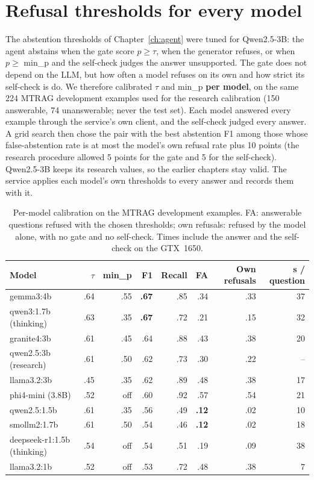 \section{Refusal thresholds for every model}\label{sec:permodel}
The abstention thresholds of Chapter~\ref{ch:agent} were tuned for Qwen2.5-3B: the agent abstains when the gate score $p \ge \tau$, when the generator refuses, or when $p \ge$ min\_p and the self-check judges the answer unsupported. The gate does not depend on the LLM, but how often a model refuses on its own and how strict its self-check is do. We therefore calibrated $\tau$ and min\_p \textbf{per model}, on the same 224 MTRAG development examples used for the research calibration (150 answerable, 74 unanswerable; never the test set). Each model answered every example through the service's own client, and the self-check judged every answer. A grid search then chose the pair with the best abstention F1 among those whose false-abstention rate is at most the model's own refusal rate plus 10 points (the research procedure allowed 5 points for the gate and 5 for the self-check). Qwen2.5-3B keeps its research values, so the earlier chapters stay valid. The service applies each model's own thresholds to every answer and records them with it.

\begin{table}[H]
\centering\small
\begin{tabular}{@{}lrrrrrrr@{}}
\toprule
Model & $\tau$ & min\_p & F1 & Recall & FA & Own refusals & s / question \\
\midrule
gemma3:4b & .64 & .55 & \textbf{.67} & .85 & .34 & .33 & 37 \\
qwen3:1.7b (thinking) & .63 & .35 & \textbf{.67} & .72 & .21 & .15 & 32 \\
granite4:3b & .61 & .45 & .64 & .88 & .43 & .38 & 20 \\
qwen2.5:3b (research) & .61 & .50 & .62 & .73 & .30 & .22 & -- \\
llama3.2:3b & .45 & .35 & .62 & .89 & .48 & .38 & 17 \\
phi4-mini (3.8B) & .52 & off & .60 & .92 & .57 & .54 & 21 \\
qwen2.5:1.5b & .61 & .35 & .56 & .49 & \textbf{.12} & .02 & 10 \\
smollm2:1.7b & .61 & .50 & .54 & .46 & \textbf{.12} & .02 & 18 \\
deepseek-r1:1.5b (thinking) & .54 & off & .54 & .51 & .19 & .09 & 38 \\
llama3.2:1b & .52 & off & .53 & .72 & .48 & .38 & 7 \\
\bottomrule
\end{tabular}
\caption{Per-model calibration on the MTRAG development examples. FA: answerable questions refused with the chosen thresholds; own refusals: refused by the model alone, with no gate and no self-check. Times include the answer and the self-check on the GTX~1650.}
\label{tab:permodel}
\end{table}

